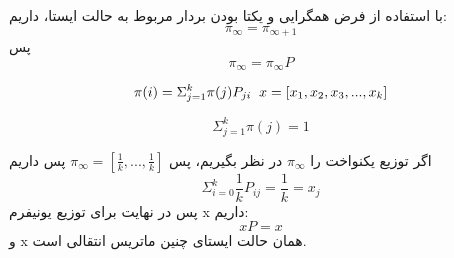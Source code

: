 با استفاده از فرض همگرایی و یکتا بودن بردار مربوط به حالت ایستا، داریم:
$$
\pi_\infty = \pi_{\infty+1}
$$
پس
$$
\pi_\infty = \pi_\infty P
$$

$$
\pi(i) = \Sigma_{j=1}^{k} \pi(j) P_{ji} \hspace{2mm} x = [x_1 , x_2 , x_3 , ... , x_k]
$$

$$
\Sigma_{j=1}^{k} \pi(j) = 1
$$

اگر توزیع یکنواخت را 
$\pi_\infty$
در نظر بگیریم،
پس
$\pi_\infty = [\frac{1}{k} , ... , \frac{1}{k}]$
پس داریم 
$$
\Sigma_{i=0}^{k} \frac{1}{k} P_{ij} = \frac{1}{k} = x_j
$$
پس در نهایت برای توزیع یونیفرم x داریم:
$$
xP = x
$$
و x همان حالت ایستای چنین ماتریس انتقالی است.